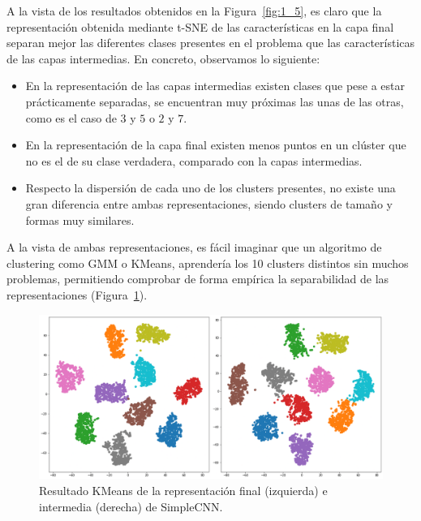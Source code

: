 \documentclass[11pt]{article}
\begin{document}
\begin{enumerate}
    A la vista de los resultados obtenidos en la Figura~\ref{fig:1_5}, es claro que la representación obtenida mediante t-SNE de las características en la capa final separan mejor las diferentes clases presentes en el problema que las características de las capas intermedias. En concreto, observamos lo siguiente:
    \begin{itemize}
        \item En la representación de las capas intermedias existen clases que pese a estar prácticamente separadas, se encuentran  muy próximas las unas de las otras, como es el caso de \( 3 \) y \( 5 \) o \( 2 \) y \( 7 \).
        \item En la representación de la capa final existen menos puntos en un clúster que no es el de su clase verdadera, comparado con la capas intermedias.
        \item Respecto  la dispersión de cada uno de los clusters presentes, no existe una gran diferencia entre ambas representaciones, siendo clusters de tamaño y formas muy similares.
    \end{itemize}
    A la vista de ambas representaciones, es fácil imaginar que un algoritmo de clustering como GMM o KMeans, aprendería los 10 clusters distintos sin muchos problemas, permitiendo comprobar de forma empírica la separabilidad de las representaciones (Figura~\ref{fig:1_51}).

    \begin{figure}[H]
        \centering
        \includegraphics[scale = 0.3]{imgs/mnist_kmeans.png}
        \caption{Resultado KMeans de la representación final (izquierda) e intermedia (derecha) de SimpleCNN.} \label{fig:1_51}
    \end{figure}

\end{enumerate}
\end{document}
